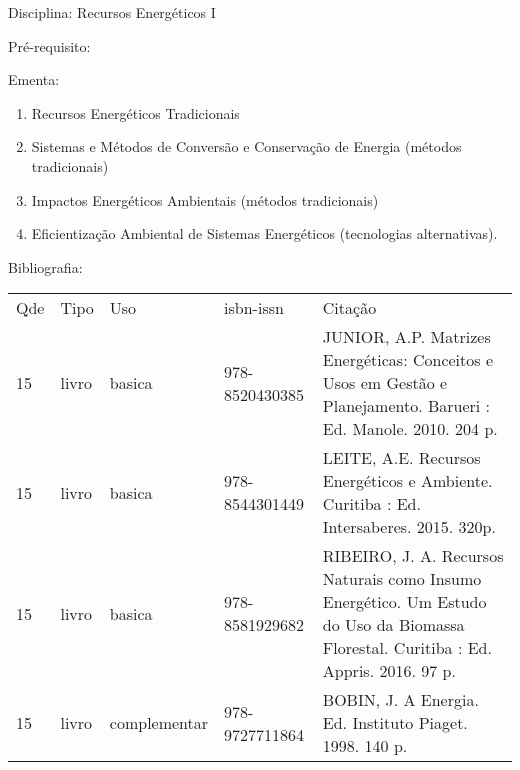 \documentclass[12pt,a4paper,twoside]{report}
\begin{document}
Disciplina: Recursos Energéticos I

Pré-requisito:
\begin{enumerate}
\end{enumerate}

Ementa:
\begin{enumerate}
\item Recursos Energéticos Tradicionais
\item Sistemas e Métodos de Conversão e Conservação de Energia (métodos tradicionais)
\item Impactos Energéticos Ambientais (métodos tradicionais)
\item Eficientização Ambiental de Sistemas Energéticos (tecnologias alternativas).
\end{enumerate}

Bibliografia:
\begin{tabular}{lllll}
Qde & Tipo & Uso & isbn-issn & Citação \\
15&livro&basica&978-8520430385&JUNIOR, A.P. Matrizes Energéticas: Conceitos e Usos em Gestão e Planejamento. Barueri : Ed. Manole. 2010. 204 p.\\
15&livro&basica&978-8544301449&LEITE, A.E. Recursos Energéticos e Ambiente. Curitiba : Ed. Intersaberes. 2015. 320p.\\
15&livro&basica&978-8581929682&RIBEIRO, J. A. Recursos Naturais como Insumo Energético. Um Estudo do Uso da Biomassa Florestal. Curitiba : Ed. Appris. 2016. 97 p.\\
15&livro&complementar&978-9727711864&BOBIN, J. A Energia. Ed. Instituto Piaget.  1998. 140 p.\\
\end{tabular}
\end{document}
